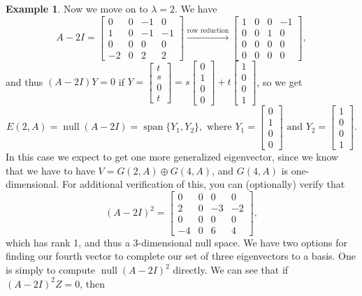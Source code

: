 \documentclass[12pt,letterpaper]{article}
\theoremstyle{definition}
\newtheorem{example}{Example}
\DeclareMathOperator{\spn}{span}
\DeclareMathOperator{\nul}{null}
\begin{document}
\begin{example}
Now we move on to $\lambda=2$. We have
\[
 A-2I = \begin{bmatrix}
         0&0&-1&0\\1&0&-1&-1\\0&0&0&0\\-2&0&2&2
        \end{bmatrix}\xrightarrow[]{\text{row reduction}}
\begin{bmatrix}
 1&0&0&-1\\0&0&1&0\\0&0&0&0\\0&0&0&0
\end{bmatrix},
\]
and thus $(A-2I)Y=0$ if $Y=\begin{bmatrix}t\\s\\0\\t\end{bmatrix}=s\begin{bmatrix}0\\1\\0\\0\end{bmatrix}+t\begin{bmatrix}1\\0\\0\\1\end{bmatrix}$, so we get
\[
 E(2,A) = \nul (A-2I) = \spn\{Y_1,Y_2\}, \text{ where } Y_1 = \begin{bmatrix}0\\1\\0\\0\end{bmatrix} \text{ and } Y_2 = \begin{bmatrix}1\\0\\0\\1\end{bmatrix}.
\]
In this case we expect to get one more generalized eigenvector, since we know that we have to have $V=G(2,A)\oplus G(4,A)$, and $G(4,A)$ is one-dimensional. For additional verification of this, you can (optionally) verify that
\[
 (A-2I)^2 = \begin{bmatrix}0&0&0&0\\2&0&-3&-2\\0&0&0&0\\-4&0&6&4\end{bmatrix},
\]
which has rank 1, and thus a 3-dimensional null space. We have two options for finding our fourth vector to complete our set of three eigenvectors to a basis. One is simply to compute $\nul(A-2I)^2$ directly. We can see that if $(A-2I)^2Z=0$, then

\end{example}
\end{document}
